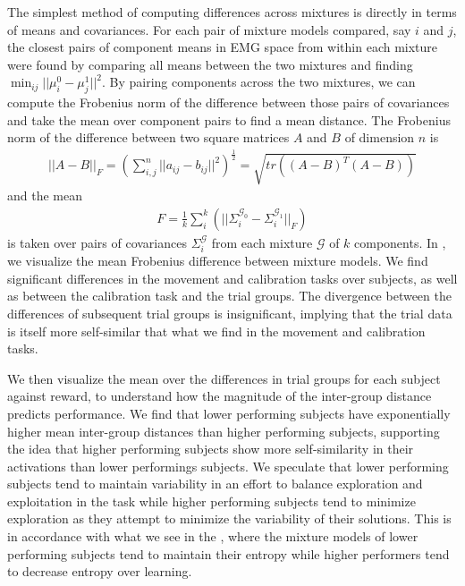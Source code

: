 \documentclass[../main.tex]{subfiles}
\begin{document}
The simplest method of computing differences across mixtures is directly in terms of means and covariances. For each pair of mixture models compared, say $i$ and $j$, the closest pairs of component means in EMG space from within each mixture were found by comparing all means between the two mixtures and finding $\min_{ij}||\mu^0_i - \mu^1_j||^2$. By pairing components across the two mixtures, we can compute the Frobenius norm of the difference between those pairs of covariances and take the mean over component pairs to find a mean distance. The Frobenius norm of the difference between two square matrices $A$ and $B$ of dimension $n$ is
%
\begin{align}
  ||A-B||_F = \left(\sum_{i,j}^{n}{||a_{ij} - b_{ij}||^2}\right)^{\frac{1}{2}} = \sqrt{tr{((A-B)^T(A-B))}}
\end{align}
%
and the mean
%
\begin{align}
  F = \frac{1}{k}\sum_{i}^{k}(||\Sigma^{\mathcal{G_0}}_i-\Sigma^{\mathcal{G_1}}_i||_F)
\end{align}
%
is taken over pairs of covariances $\Sigma^{\mathcal{G}}_i$ from each mixture $\mathcal{G}$ of $k$ components. In , we visualize the mean Frobenius difference between mixture models. We find significant differences in the movement and calibration tasks over subjects, as well as between the calibration task and the trial groups. The divergence between the differences of subsequent trial groups is insignificant, implying that the trial data is itself more self-similar that what we find in the movement and calibration tasks.

We then visualize the mean over the differences in trial groups for each subject against reward, to understand how the magnitude of the inter-group distance predicts performance. We find that lower performing subjects have exponentially higher mean inter-group distances than higher performing subjects, supporting the idea that higher performing subjects show more self-similarity in their activations than lower performings subjects. We speculate that lower performing subjects tend to maintain variability in an effort to balance exploration and exploitation in the task while higher performing subjects tend to minimize exploration as they attempt to minimize the variability of their solutions. This is in accordance with what we see in the , where the mixture models of lower performing subjects tend to maintain their entropy while higher performers tend to decrease entropy over learning.
\end{document}
